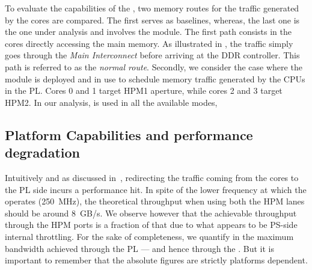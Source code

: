 
To evaluate the capabilities of the \schim, two memory routes for
the traffic generated by the cores are compared. The first serves
as baselines, whereas, the last one is the one under analysis and
involves the \schim module.  The first path consists in the cores
directly accessing the main memory. As illustrated in
, the traffic simply goes through the
\emph{Main Interconnect} before arriving at the DDR controller. This
path is referred to as the \emph{normal route}.
Secondly, we consider the case where the \schim module is deployed and in
use to schedule memory traffic generated by the CPUs in the PL. Cores
0 and 1 target HPM1 aperture, while cores 2 and 3 target HPM2. In our
analysis, \schim is used in all the available modes, 

\subsection{Platform Capabilities and performance degradation}
\label{subsec:platform-capabilities-and-performance-degradation}
Intuitively and as discussed in~\cite{PLIM20}, redirecting the traffic
coming from the cores to the PL side incurs a performance hit. In
spite of the lower frequency at which the \schim operates (250~MHz),
the theoretical throughput when using both the HPM lanes should be
around 8~GB/s. We observe however that the achievable throughput
through the HPM ports is a fraction of that due to what appears to be
PS-side internal throttling. For the sake of completeness, we quantify
in  the maximum bandwidth achieved
through the PL --- and hence through the \schim. But it is important
to remember that the absolute figures are strictly platforms
dependent.

